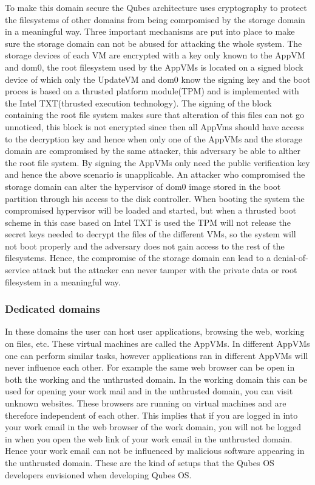 \documentclass[runningheads,a4paper]{article}
\begin{document}
To make this domain secure the Qubes architecture uses cryptography to
protect the filesystems of other domains from being comrpomised by the
storage domain in a meaningful way. Three important mechanisms are put
into place to make sure the storage domain can not be abused for
attacking the whole system. The storage devices of each VM are
encrypted with a key only known to the AppVM and dom0, the root
filesystem used by the AppVMs is located on a signed block device of
which only the UpdateVM and dom0 know the signing key and the boot
proces is based on a thrusted platform module(TPM) and is implemented
with the Intel TXT(thrusted execution technology). The signing of the
block containing the root file system makes sure that alteration of
this files can not go unnoticed, this block is not encrypted since
then all AppVms should have access to the decryption key and hence
when only one of the AppVMs and the storage domain are compromised by
the same attacker, this adversary be able to alther the root file
system. By signing the AppVMs only need the public verification key
and hence the above scenario is unapplicable. An attacker who
compromised the storage domain can alter the hypervisor of dom0 image
stored in the boot partition through his access to the disk
controller. When booting the system the compromised hypervisor will be
loaded and started, but when a thrusted boot scheme in this case based
on Intel TXT is used the TPM will not release the secret keys needed
to decrypt the files of the different VMs, so the system will not boot
properly and the adversary does not gain access to the rest of the
filesystems. Hence, the compromise of the storage domain can lead to a
denial-of-service attack but the attacker can never tamper with the
private data or root filesystem in a meaningful way.

\subsubsection{Dedicated domains}

In these domains the user can host user applications, browsing the
web, working on files, etc. These virtual machines are called the
AppVMs. In different AppVMs one can perform similar tasks, however
applications ran in different AppVMs will never influence each other. 
For example the same web browser can be
open in both the working and the unthrusted domain. In the working
domain this can be used for opening your work mail and in the
unthrusted domain, you can visit unknown websites. These browsers are
running on virtual machines and are therefore independent of each
other. This implies that if you are logged in into your work email in
the web browser of the work domain, you will not be logged in when you
open the web link of your work email in the unthrusted domain. Hence
your work email can not be influenced by malicious software appearing
in the unthrusted domain. These are the kind of setups that the Qubes
OS developers envisioned when developing Qubes OS.
\end{document}
